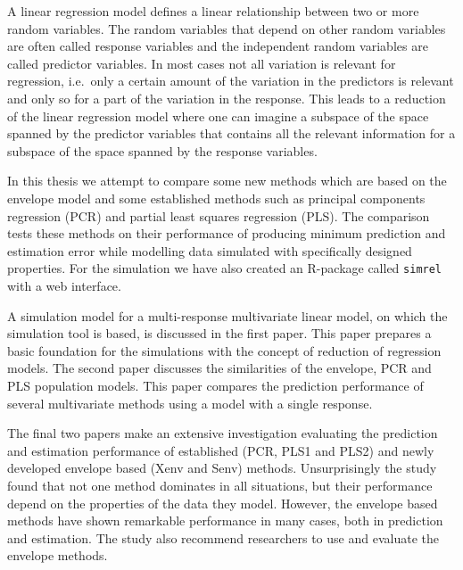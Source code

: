 A linear regression model defines a linear relationship between two or
more random variables. The random variables that depend on other random
variables are often called response variables and the independent random
variables are called predictor variables. In most cases not all
variation is relevant for regression, i.e.~only a certain amount of the
variation in the predictors is relevant and only so for a part of the
variation in the response. This leads to a reduction of the linear
regression model where one can imagine a subspace of the space spanned
by the predictor variables that contains all the relevant information
for a subspace of the space spanned by the response variables.

In this thesis we attempt to compare some new methods which are based on
the envelope model and some established methods such as principal
components regression (PCR) and partial least squares regression (PLS).
The comparison tests these methods on their performance of producing
minimum prediction and estimation error while modelling data simulated
with specifically designed properties. For the simulation we have also
created an R-package called \texttt{simrel} with a web interface.

A simulation model for a multi-response multivariate linear model, on
which the simulation tool is based, is discussed in the first paper.
This paper prepares a basic foundation for the simulations with the
concept of reduction of regression models. The second paper discusses
the similarities of the envelope, PCR and PLS population models. This
paper compares the prediction performance of several multivariate
methods using a model with a single response.

The final two papers make an extensive investigation evaluating the
prediction and estimation performance of established (PCR, PLS1 and
PLS2) and newly developed envelope based (Xenv and Senv) methods.
Unsurprisingly the study found that not one method dominates in all
situations, but their performance depend on the properties of the data
they model. However, the envelope based methods have shown remarkable
performance in many cases, both in prediction and estimation. The study
also recommend researchers to use and evaluate the envelope methods.
